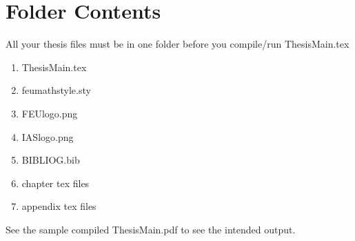 \section{Folder Contents}
All your thesis files must be in one folder before you compile/run ThesisMain.tex

\begin{enumerate}
	\item ThesisMain.tex
	\item feumathstyle.sty
	\item FEUlogo.png
	\item IASlogo.png
	\item BIBLIOG.bib
	\item chapter tex files
	\item appendix tex files
\end{enumerate}

See the sample compiled ThesisMain.pdf to see the intended output.